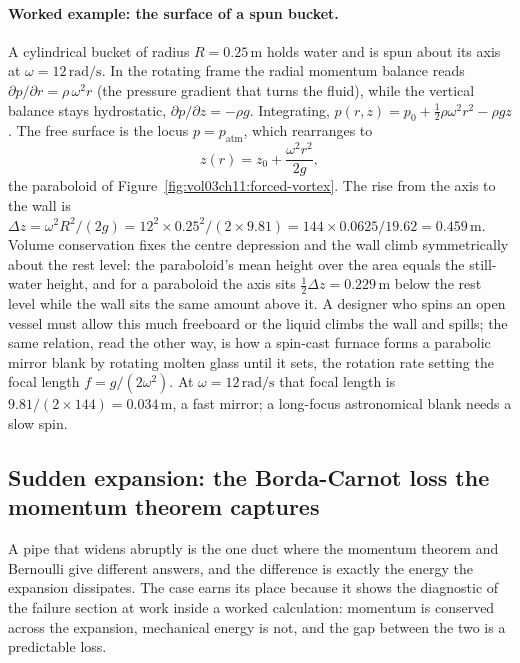 

\paragraph{Worked example: the surface of a spun bucket.} A cylindrical
bucket of radius $R = 0.25\,\si{\meter}$ holds water and is spun about
its axis at $\omega = 12\,\si{\radian\per\second}$. In the rotating
frame the radial momentum balance reads $\partial p/\partial r =
\rho\,\omega^2 r$ (the pressure gradient that turns the fluid),
while the vertical balance stays hydrostatic, $\partial p/\partial z =
-\rho g$. Integrating, $p(r,z) = p_0 + \tfrac12\rho\omega^2 r^2 -
\rho g z$. The free surface is the locus $p = p_\text{atm}$, which
rearranges to
\[
z(r) = z_0 + \frac{\omega^2 r^2}{2g},
\]
the paraboloid of Figure~\ref{fig:vol03ch11:forced-vortex}. The rise
from the axis to the wall is $\Delta z = \omega^2 R^2/(2g) = 12^2\times
0.25^2/(2\times 9.81) = 144\times 0.0625/19.62 = 0.459\,\si{\meter}$.
Volume conservation fixes the centre depression and the wall climb
symmetrically about the rest level: the paraboloid's mean height over
the area equals the still-water height, and for a paraboloid the axis
sits $\tfrac12\Delta z = 0.229\,\si{\meter}$ below the rest level while
the wall sits the same amount above it. A designer who spins an open
vessel must allow this much freeboard or the liquid climbs the wall and
spills; the same relation, read the other way, is how a spin-cast
furnace forms a parabolic mirror blank by rotating molten glass until
it sets, the rotation rate setting the focal length $f = g/(2\omega^2)$.
At $\omega = 12\,\si{\radian\per\second}$ that focal length is
$9.81/(2\times 144) = 0.034\,\si{\meter}$, a fast mirror; a long-focus
astronomical blank needs a slow spin.

\subsection{Sudden expansion: the Borda-Carnot loss the momentum theorem captures}

A pipe that widens abruptly is the one duct where the momentum theorem
and Bernoulli give different answers, and the difference is exactly the
energy the expansion dissipates. The case earns its place because it
shows the diagnostic of the failure section at work inside a worked
calculation: momentum is conserved across the expansion, mechanical
energy is not, and the gap between the two is a predictable loss.

